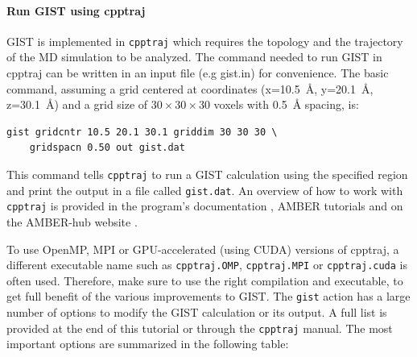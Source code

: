 \documentclass[9pt,tutorial]{livecoms}
\newcommand{\software}{\texttt}
\newcommand\inlinecode{\texttt}
\begin{document}
\paragraph{Run GIST using cpptraj}
GIST is implemented in \software{cpptraj} which requires the topology and the trajectory of the MD simulation to be analyzed.
The command needed to run GIST in cpptraj can be written in an input file (e.g gist.in) for convenience. The basic command, assuming a grid centered at coordinates (x=\SI{10.5}{\angstrom}, y=\SI{20.1}{\angstrom}, z=\SI{30.1}{\angstrom}) and a grid size of $30\times30\times30$ voxels with \SI{0.5}{\angstrom} spacing, is:

\begin{lstlisting}[style=cpptraj]
gist gridcntr 10.5 20.1 30.1 griddim 30 30 30 \
	gridspacn 0.50 out gist.dat
\end{lstlisting}
This command tells \software{cpptraj} to run a GIST calculation using the specified region and print the output in a file called \inlinecode{gist.dat}.  An overview of how to work with \software{cpptraj} is provided in the program's documentation \cite{cpptraj_doc}, AMBER tutorials \cite{amber_tut_cpptraj} and on the AMBER-hub website \cite{amber_hub}.

To use OpenMP, MPI or GPU-accelerated (using CUDA) versions of cpptraj, a different executable name such as \inlinecode{cpptraj.OMP}, \inlinecode{cpptraj.MPI} or \inlinecode{cpptraj.cuda} is often used.
Therefore, make sure to use the right compilation and executable, to get full benefit of the various improvements to GIST.
The \inlinecode{gist} action has a large number of options to modify the GIST calculation or its output.
A full list is provided at the end of this tutorial or through the \software{cpptraj} manual.
The most important options are summarized in the following table:
\end{document}
